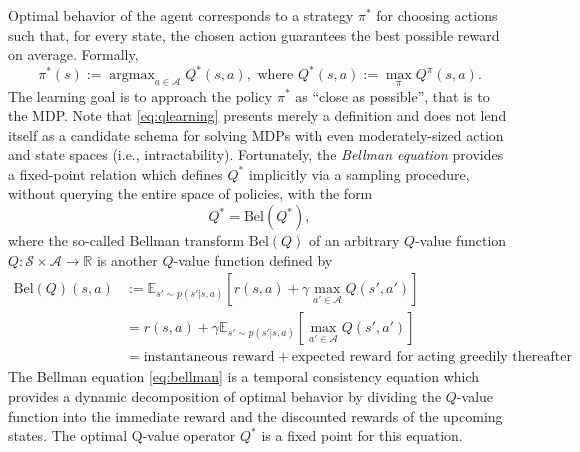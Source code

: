 \documentclass[10pt,letterpaper]{article}
\DeclareMathOperator{\argmax}{argmax}
\begin{document}
Optimal behavior of the agent corresponds to
a strategy $\pi^*$ for choosing actions such that, for every state, the chosen action guarantees the best possible reward on average. Formally,
\begin{equation}
  \pi^*(s) := \argmax_{a \in \mathcal A}{Q}^*(s, a),\text{ where }Q^*(s, a) := \max_{\pi}Q^\pi(s,a).
  \label{eq:qlearning}
\end{equation}
The learning goal is to approach the
policy $\pi^*$ as ``close as possible'', that is to  the MDP.
Note that \eqref{eq:qlearning} presents merely a definition and
does not lend itself as a candidate schema
for solving MDPs with even moderately-sized action and state spaces
(i.e., intractability).
Fortunately, the \textit{Bellman equation} \citep{sutton1998reinforcement} provides a fixed-point relation which defines $Q^*$ implicitly via a sampling procedure, without querying the entire space of policies, with the form
\begin{equation}
  Q^* = \text{Bel}(Q^*),
  \label{eq:bellman}
\end{equation}
where the so-called Bellman transform $\text{Bel}(Q)$
of an arbitrary $Q$-value function $Q: \mathcal S \times \mathcal A \rightarrow \mathbb R$  is another $Q$-value function defined by
\begin{equation}
  \begin{split}
   \text{Bel}(Q)(s,a) &:=
   \mathbb E_{s' \sim p(s'|s,a)} [r(s,a) + \gamma \max_{a' \in \mathcal A}Q(s', a')]\\
   &= r(s,a) + \gamma\mathbb E_{s' \sim p(s'|s,a)} [\max_{a' \in \mathcal A}Q(s', a')]\\
   &= \text{instantaneous reward} + \text{expected reward for acting greedily thereafter}
    \end{split}
  \end{equation}
The Bellman equation \eqref{eq:bellman} is a temporal consistency equation which provides
a dynamic decomposition of optimal behavior by dividing the $Q$-value function into the immediate
reward and the discounted rewards of the upcoming states.
The optimal Q-value operator $Q^*$ is a fixed point for this equation.
\end{document}
